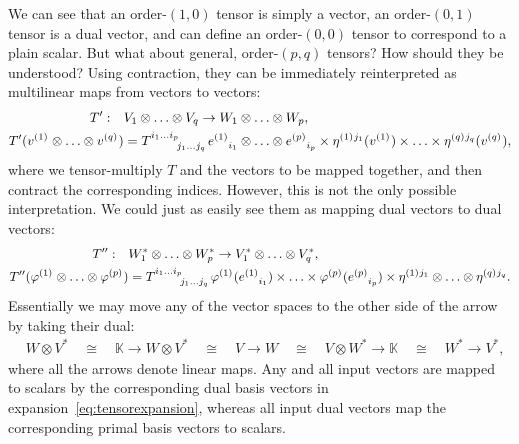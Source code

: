 \documentclass[aps,pra,12pt,nofootinbib,superscriptaddress,longbibliography]{revtex4-1}
\theoremstyle{plain}
\theoremstyle{definition}
\newcommand{\isom}{\cong}  %
\newcommand{\K}{{\mathbb K}}  %
\newcommand{\spidx}[3]{^{(#1)}{}\indices{^{#2}_{#3}}}
\newcommand{\bv}{e}     %
\newcommand{\dv}{\eta}  %
\begin{document}
We can see that an order-$(1,0)$ tensor is simply a vector,
an order-$(0,1)$ tensor is a dual vector,
and can define an order-$(0,0)$ tensor to correspond to a plain scalar.
But what about general, order-$(p,q)$ tensors?
How should they be understood?
Using contraction, they can be immediately
reinterpreted as multilinear maps from vectors to vectors:
\begin{align}
\label{eq:Tmultilin}
\notag
T':\quad& V_1 \otimes \ldots \otimes V_q \to W_1 \otimes \ldots \otimes W_p,\\
T'(v\spidx{1}{}{} \otimes \ldots \otimes v\spidx{q}{}{}) &=
T\indices{^{i_1 \ldots i_p}_{j_1 \ldots j_q}}
\bv\spidx{1}{}{i_1} \otimes \ldots \otimes \bv\spidx{p}{}{i_p}
\times
\dv\spidx{1}{j_1}{}(v\spidx{1}{}{}) \times \ldots \times \dv\spidx{q}{j_q}{}(v\spidx{q}{}{}),
\end{align}
where we tensor-multiply $T$ and the vectors to be mapped together, and then contract the corresponding indices.
However, this is not the only possible interpretation.
We could just as easily see them as mapping dual vectors to dual vectors:
\begin{align}
\label{eq:Tmultilin2}
\notag
T'':\quad& W^*_1 \otimes \ldots \otimes W^*_p \to V^*_1 \otimes \ldots \otimes V^*_q,\\
T''(\varphi\spidx{1}{}{} \otimes \ldots \otimes \varphi\spidx{p}{}{}) &=
T\indices{^{i_1 \ldots i_p}_{j_1 \ldots j_q}}
\varphi\spidx{1}{}{}(\bv\spidx{1}{}{i_1}) \times \ldots \times \varphi\spidx{p}{}{}(\bv\spidx{p}{}{i_p})
\times
\dv\spidx{1}{j_1}{} \otimes \ldots \otimes \dv\spidx{q}{j_q}{}.
\end{align}
Essentially we may move any of the vector spaces to the
other side of the arrow by taking their dual:
\begin{align}
\label{eq:tensor-interp}
&W \otimes V^*
\quad \isom \quad
\K \to W \otimes V^*
\quad \isom \quad
V \to W
\quad \isom \quad
V \otimes W^* \to \K
\quad \isom \quad
W^* \to V^*,
\end{align}
where all the arrows denote linear maps.
Any and all input vectors are mapped to scalars by the corresponding
dual basis vectors in expansion~\eqref{eq:tensorexpansion}, whereas all input dual vectors map the
corresponding primal basis vectors to scalars.
\end{document}
